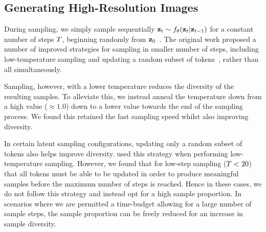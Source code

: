 
\subsection{Generating High-Resolution Images}
\label{subsec:sundaeSampling}



During sampling, we simply sample sequentially $\mathbf{z}_t \sim f_\theta(\mathbf{z}_t
\vert \mathbf{z}_{t-1})$ for a constant number of steps $T$, beginning
randomly from $\mathbf{z}_0$~\cite{savinov2022stepunrolled}. The original work
proposed a number of improved strategies for sampling in smaller number of
steps, including low-temperature sampling and updating a random subset of
tokens~\cite{savinov2022stepunrolled}, rather than all simultaneously.

Sampling, however, with a lower temperature reduces the diversity of the
resulting samples. To alleviate this, we instead anneal the temperature down
from a high value ($\approx 1.0$) down to a lower value towards the end of the
sampling process. We found this retained the fast sampling speed whilst also
improving diversity.

In certain latent sampling configurations, updating only a random subset of
tokens also helps improve diversity. \cite{savinov2022stepunrolled} used this
strategy when performing low-temperature sampling. However, we found that for
low-step sampling ($T<20$) that all tokens must be able to be updated
in order to produce meaningful samples before the maximum number of steps is
reached. Hence in these cases, we do not follow this strategy and instead opt
for a high sample proportion. In scenarios where we are permitted a time-budget
allowing for a large number of sample steps, the sample proportion can be freely
reduced for an increase in sample diversity.

